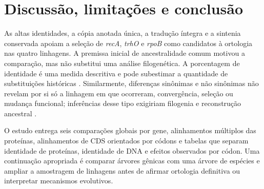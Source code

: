 \documentclass[12pt]{article}
\begin{document}
\section{Discussão, limitações e conclusão}

As altas identidades, a cópia anotada única, a tradução íntegra e a sintenia
conservada apoiam a seleção de \textit{recA}, \textit{trhO} e \textit{rpoB}
como candidatos à ortologia nas quatro linhagens. A premissa inicial de
ancestralidade comum motivou a comparação, mas não substitui uma análise
filogenética. A porcentagem de identidade é uma medida descritiva e pode
subestimar a quantidade de substituições históricas \cite{yang2006}.
Similarmente, diferenças sinônimas e não sinônimas não revelam por si só a
linhagem em que ocorreram, convergência, seleção ou mudança funcional;
inferências desse tipo exigiriam filogenia e reconstrução ancestral
\cite{zhang1997}.

O estudo entrega seis comparações globais por gene, alinhamentos múltiplos
das proteínas, alinhamentos de CDS orientados por códons e tabelas que
separam identidade de proteínas, identidade de DNA e efeitos observados
por códon. Uma continuação apropriada é comparar árvores gênicas com uma
árvore de espécies e ampliar a amostragem de linhagens antes de afirmar
ortologia definitiva ou interpretar mecanismos evolutivos.



\end{document}
